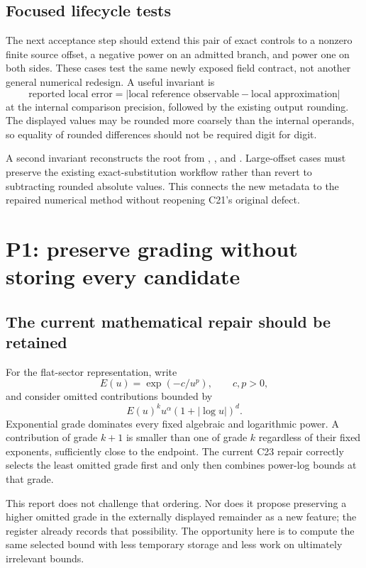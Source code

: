 \documentclass[11pt,letterpaper]{article}
\newcommand{\code}[1]{\texttt{\detokenize{#1}}}
\begin{document}
\subsection{Focused lifecycle tests}
The next acceptance step should extend this pair of exact controls to a nonzero finite source offset, a negative power on an admitted branch, and power one on both sides. These cases test the same newly exposed field contract, not another general numerical redesign. A useful invariant is
\[
 \text{reported local error}
 =\bigl|\text{local reference observable}
       -\text{local approximation}\bigr|
\]
at the internal comparison precision, followed by the existing output rounding. The displayed values may be rounded more coarsely than the internal operands, so equality of rounded differences should not be required digit for digit.

A second invariant reconstructs the root from \code{SourceOffset}, \code{SourceSide}, and \code{LocalRoot}. Large-offset cases must preserve the existing exact-substitution workflow rather than revert to subtracting rounded absolute values. This connects the new metadata to the repaired numerical method without reopening C21's original defect.

\section{P1: preserve grading without storing every candidate}
\label{sec:p1}

\subsection{The current mathematical repair should be retained}
For the flat-sector representation, write
\[
 E(u)=\exp(-c/u^p),\qquad c,p>0,
\]
and consider omitted contributions bounded by
\[
 E(u)^k u^\alpha(1+|\log u|)^d.
\]
Exponential grade dominates every fixed algebraic and logarithmic power. A contribution of grade $k+1$ is smaller than one of grade $k$ regardless of their fixed exponents, sufficiently close to the endpoint. The current C23 repair correctly selects the least omitted grade first and only then combines power-log bounds at that grade.~\cite{flatops,status}

This report does not challenge that ordering. Nor does it propose preserving a higher omitted grade in the externally displayed remainder as a new feature; the register already records that possibility. The opportunity here is to compute the same selected bound with less temporary storage and less work on ultimately irrelevant bounds.
\end{document}
